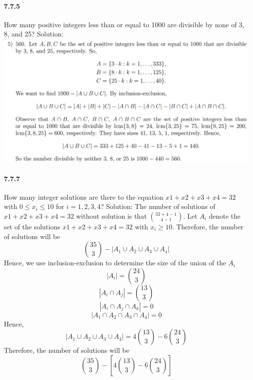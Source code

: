 \documentclass{article}
\begin{document}
\paragraph{7.7.5}
How many positive integers less than or equal to 1000 are divisible by none of 3, 8,
and 25?\newline
Solution:\newline
\includegraphics{0011}
\paragraph{7.7.7}
How many integer solutions are there to the equation $x1 + x2 + x3 + x4 = 32$ with
$0 \leq x_i \leq 10$ for $i = 1, 2, 3, 4$?\newline
Solution:\newline
The number of solutions of $x1 + x2 + x3 + x4 = 32$ without solution is that $\binom{32+4-1}{4-1}$. Let $A_i$ denote the set of the solutions $x1 + x2 + x3 + x4 = 32$ with $x_i\ge 10$. Therefore, the number of solutions will be$$\binom{35}{3}-|A_1\cup A_2\cup A_3 \cup A_4|$$
Hence, we use inclusion-exclusion to determine the size of the union of the $A_i$
$$|A_i|=\binom{24}{3}$$
$$|A_i\cap A_j|=\binom{13}{3}$$
$$|A_i\cap A_j \cap A_k|=0$$
$$|A_1\cap A_2 \cap A_3 \cap A_4|=0$$ Hence,
$$|A_1\cup A_2\cup A_3 \cup A_4|=4\binom{13}{3}-6\binom{24}{3}$$
Therefore, the number of solutions will be
$$\binom{35}{3}-[4\binom{13}{3}-6\binom{24}{3}]$$
\end{document}
